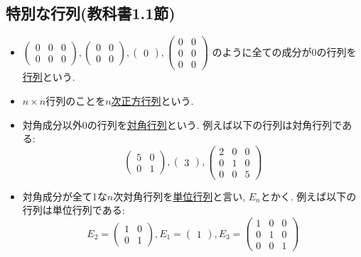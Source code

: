 \documentclass[dvipdfmx,a4paper,11pt]{article}
\theoremstyle{definition}
\begin{document}
\subsection{特別な行列(教科書1.1節)}
\begin{itemize}
\item  $
 \begin{pmatrix}
0 &0&0\\
0 &0&0
 \end{pmatrix}, 
  \begin{pmatrix}
0 &0\\
0 &0
 \end{pmatrix}, 
   \begin{pmatrix}
0 
 \end{pmatrix}, 
   \begin{pmatrix}
0 &0\\
0 &0 \\
0&0
 \end{pmatrix}
 $
 のように全ての成分が0の行列を\underline{行列}という.
 \item $n \times n$行列のことを\underline{$n$次正方行列}という.
 \item 対角成分以外0の行列を\underline{対角行列}という. 例えば以下の行列は対角行列である:
  $$
 \begin{pmatrix}
5&0\\
0 &1
 \end{pmatrix}, 
  \begin{pmatrix}
3
 \end{pmatrix}, 
   \begin{pmatrix}
2&0 &0\\
0 &1 &0\\
0&0&5
 \end{pmatrix}
 $$
 \item 対角成分が全て1な$n$次対角行列を\underline{単位行列}と言い, $E_n$とかく. 例えば以下の行列は単位行列である:
   $$
   E_2 =
 \begin{pmatrix}
1&0\\
0 &1
 \end{pmatrix}, 
 E_1=
  \begin{pmatrix}
1
 \end{pmatrix}, 
 E_3=
   \begin{pmatrix}
1&0 &0\\
0 &1 &0\\
0&0&1
 \end{pmatrix}
 $$
\end{itemize}

\newpage
\end{document}
